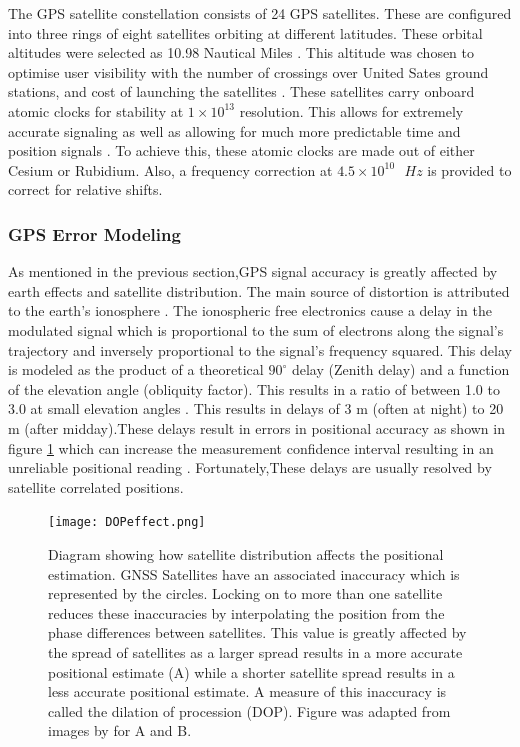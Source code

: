 The GPS satellite constellation consists of 24 GPS satellites. These are configured into three rings of eight satellites orbiting at different latitudes. These orbital altitudes were selected as 10.98 Nautical Miles \cite{spilker1996global}. This altitude was chosen to optimise user visibility with the number of crossings over United Sates ground stations, and cost of launching the satellites \cite{spilker1996global}. These satellites carry onboard atomic clocks for stability at $1\times10^{13}$ resolution. This allows for extremely accurate signaling as well as allowing for much more predictable time and position signals \cite{spilker1996global}. To achieve this, these atomic clocks are made out of either Cesium or Rubidium. Also, a frequency correction at $4.5\times10^{10} \text{ } Hz$ is provided to correct for relative shifts. \par

\subsubsection{GPS Error Modeling}

As mentioned in the previous section,GPS signal accuracy is greatly affected by earth effects and satellite distribution. The main source of distortion is attributed to the earth's ionosphere \cite{spilker1996global}. The ionospheric free electronics cause a delay in the modulated signal which is proportional to the sum of electrons along the signal's trajectory and inversely proportional to the signal's frequency squared. This delay is modeled as the product of a theoretical $90^\circ$ delay (Zenith delay) and a function of the elevation angle (obliquity factor). This results in a ratio of between 1.0 to 3.0 at small elevation angles \cite{spilker1996global}. This results in delays of 3 m (often at night) to 20 m (after midday).These delays result in errors in positional accuracy as shown in figure \ref{fig:DOP_effects} which can increase the measurement confidence interval resulting in an unreliable positional reading \cite{spilker1996global}. Fortunately,These delays are usually resolved by satellite correlated positions.

\begin{figure}[H]
	\centering
	\texttt{[image: DOPeffect.png]}
	\caption{Diagram showing how satellite distribution affects the positional estimation. GNSS Satellites have an associated inaccuracy which is represented by the circles. Locking on to more than one satellite reduces these inaccuracies by interpolating the position from the phase differences between satellites. This value is greatly affected by the spread of satellites as a larger spread results in a more accurate positional estimate (A) while a shorter satellite spread results in a less accurate positional estimate. A measure of this inaccuracy is called the dilation of procession (DOP). Figure was adapted from images by \cite{GISGeo2020DOP} for A and B.}
	\label{fig:DOP_effects}
\end{figure}

